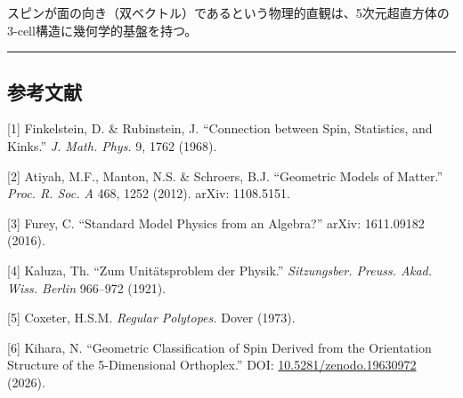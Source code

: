 \documentclass[a4paper,11pt]{ltjsarticle}
\begin{document}
スピンが面の向き（双ベクトル）であるという物理的直観は、5次元超直方体の3-cell構造に幾何学的基盤を持つ。

\begin{center}\rule{0.5\linewidth}{0.5pt}\end{center}

\subsection*{参考文献}

{[}1{]} Finkelstein, D. \& Rubinstein, J. ``Connection between Spin, Statistics, and Kinks.'' \emph{J. Math. Phys.} 9, 1762 (1968).

{[}2{]} Atiyah, M.F., Manton, N.S. \& Schroers, B.J. ``Geometric Models of Matter.'' \emph{Proc. R. Soc. A} 468, 1252 (2012). arXiv: 1108.5151.

{[}3{]} Furey, C. ``Standard Model Physics from an Algebra?'' arXiv: 1611.09182 (2016).

{[}4{]} Kaluza, Th. ``Zum Unitätsproblem der Physik.'' \emph{Sitzungsber. Preuss. Akad. Wiss. Berlin} 966--972 (1921).

{[}5{]} Coxeter, H.S.M. \emph{Regular Polytopes.} Dover (1973).

{[}6{]} Kihara, N. ``Geometric Classification of Spin Derived from the Orientation Structure of the 5-Dimensional Orthoplex.'' DOI: \href{https://doi.org/10.5281/zenodo.19630972}{10.5281/zenodo.19630972} (2026).
\end{document}
